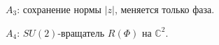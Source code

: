\begin{figure}[htbp]
  \centering
  
  \caption{$A_3$: сохранение нормы $|z|$, меняется только фаза.}
  \label{fig:axiom-a3-phase}
\end{figure}

\begin{figure}[htbp]
  \centering
  
  \caption{$A_4$: $SU(2)$-вращатель $R(\Phi)$ на $\mathbb{C}^2$.}
  \label{fig:axiom-a4-su2}
\end{figure}

